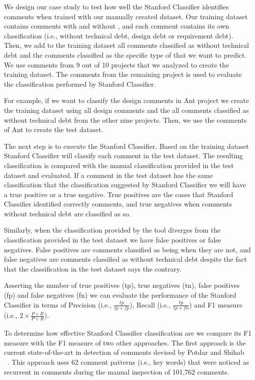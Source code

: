 We design our case study to test how well the Stanford Classifier identifies \SATD comments when trained with our manually created dataset. Our training dataset contains comments with and without \SATD, and each comment contains its own classification (i.e., without technical debt, design debt or requirement debt). Then, we add to the training dataset all comments classified as without technical debt and the comments classified as the specific type of \SATD that we want to predict. We use comments from 9 out of 10 projects that we analyzed to create the training dataset. The comments from the remaining project is used to evaluate the classification performed by Stanford Classifier.

For example, if we want to classify the design \SATD comments in Ant project we create the training dataset using all design \SATD comments and the all comments classified as without technical debt from the other nine projects. Then, we use the comments of Ant to create the test dataset. 

The next step is to execute the Stanford Classifier. Based on the training dataset Stanford Classifier will classify each comment in the test dataset. The resulting classification is compared with the manual classification provided in the test dataset and evaluated. If a comment in the test dataset has the same classification that the classification suggested by Stanford Classifier we will have a true positive or a true negative. True positives are the cases that Stanford Classifier identified correctly \SATD comments, and true negatives when comments without technical debt are classified as so. 

Similarly, when the classification provided by the tool diverges from the classification provided in the test dataset we have false positives or false negatives. False positives are comments classified as being \SATD when they are not, and false negatives are comments classified as without technical debt despite the fact that the classification in the test dataset says the contrary.

Asserting the number of true positives (tp), true negatives (tn), false positives (fp) and false negatives (fn) we can evaluate the performance of the Stanford Classifier in terms of Precision (i.e., $\frac{tp}{tp + fp}$), Recall (i.e., $\frac{tp}{tp + fn}$) and F1 measure (i.e., $2 \times \frac{P \times R}{P + R}$).

To determine how effective Stanford Classifier classification are we compare its F1 measure with the F1 measure of two other approaches. The first approach is the current state-of-the-art in detection of \SATD comments devised by Potdar and Shihab ~\cite{Potdar2014ICSME}. This approach uses 62 comment patterns (i.e., key words) that were noticed as recurrent in \SATD comments during the manual inspection of 101,762 comments. 

